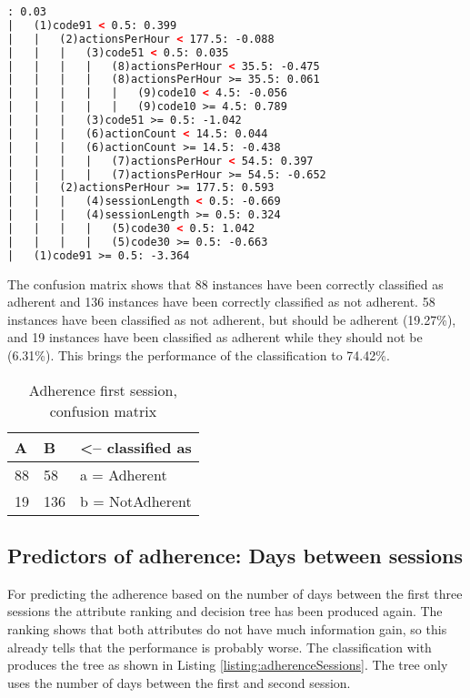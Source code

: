 \begin{lstlisting}[caption={Adherence first session, ADTree decision tree}, label=listing:adherenceFirstTree, float=htpb, language=xml]
: 0.03
|	(1)code91 < 0.5: 0.399
|	|	(2)actionsPerHour < 177.5: -0.088
|	|	|	(3)code51 < 0.5: 0.035
|	|	|	|	(8)actionsPerHour < 35.5: -0.475
|	|	|	|	(8)actionsPerHour >= 35.5: 0.061
|	|	|	|	|	(9)code10 < 4.5: -0.056
|	|	|	|	|	(9)code10 >= 4.5: 0.789
|	|	|	(3)code51 >= 0.5: -1.042
|	|	|	(6)actionCount < 14.5: 0.044
|	|	|	(6)actionCount >= 14.5: -0.438
|	|	|	|	(7)actionsPerHour < 54.5: 0.397
|	|	|	|	(7)actionsPerHour >= 54.5: -0.652
|	|	(2)actionsPerHour >= 177.5: 0.593
|	|	|	(4)sessionLength < 0.5: -0.669
|	|	|	(4)sessionLength >= 0.5: 0.324
|	|	|	|	(5)code30 < 0.5: 1.042
|	|	|	|	(5)code30 >= 0.5: -0.663
|	(1)code91 >= 0.5: -3.364
\end{lstlisting}

The confusion matrix shows that 88 instances have been correctly classified as adherent and 136 instances have been correctly classified as not adherent. 58 instances have been classified as not adherent, but should be adherent (19.27\%), and 19 instances have been classified as adherent while they should not be (6.31\%). This brings the performance of the classification to 74.42\%.

\begin{table}[]
	\centering
	\caption{Adherence first session, \\confusion matrix}
	\label{table:adherenceFirstMatrix}
	\begin{tabular}{@{}ll|l@{}}
		\toprule
		\textbf{A} & \textbf{B} & \textless-- classified as \\ \midrule
		88         & 58         & a = Adherent              \\
		19         & 136        & b = NotAdherent           \\ \bottomrule
	\end{tabular}
\end{table}


\subsection{Predictors of adherence: Days between sessions}
For predicting the adherence based on the number of days between the first three sessions the attribute ranking and decision tree has been produced again. The ranking shows that both attributes do not have much information gain, so this already tells that the performance is probably worse. The classification with  produces the tree as shown in Listing \ref{listing:adherenceSessions}. The tree only uses the number of days between the first and second session.

